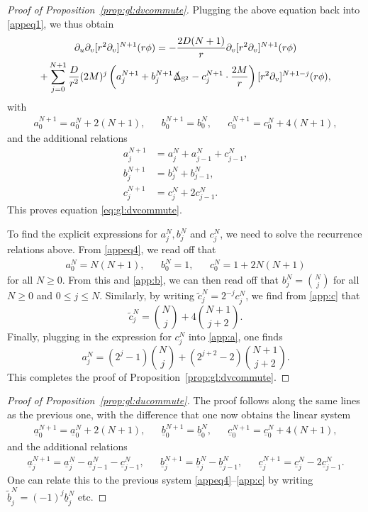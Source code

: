 \documentclass[11pt,english]{article}
\numberwithin{equation}{section}
\theoremstyle{remark}
\theoremstyle{plain}
\theoremstyle{remark}
\newcommand{\pu}{\partial_u}
\newcommand{\pv}{\partial_v}
\renewcommand{\(}{\left(}
\renewcommand{\)}{\right)}
\begin{document}
\begin{proof}[Proof of Proposition~\ref{prop:gl:dvcommute}]
Plugging the above equation back into \eqref{appeq1}, we thus obtain
\begin{multline}
\pu\pv[r^2\pv]^{N+1}(r\phi)=-\frac{2D(N+1)}{r}\pv[r^2\pv]^{N+1}(r\phi)\\+
\sum_{j=0}^{N+1}\frac{D}{r^2}(2M)^j\left(a_j^{N+1}+b_j^{N+1}\slashed{\Delta}_{\mathbb{S}^2}-c_j^{N+1}\cdot\frac{2M}{r}\right)[r^2\pv]^{N+1-j}(r\phi),
\end{multline}
with 
\begin{align}\label{appeq4}
a_0^{N+1}=a_0^N+2(N+1),&&b_0^{N+1}=b_0^N,&&c_0^{N+1}=c_0^N+4(N+1),
\end{align}
and the additional relations
\begin{align}
a_j^{N+1}&=a_j^N+a_{j-1}^N+c_{j-1}^N\label{app:a},\\
b_j^{N+1}&=b_{j}^N+b_{j-1}^N,\label{app:b}\\
c_{j}^{N+1}&=c_j^N+2c_{j-1}^N.\label{app:c}
\end{align}
This proves equation \eqref{eq:gl:dvcommute}. 

To find the explicit expressions for $a_j^N, b_j^N$ and $c_j^N$, we need to solve the recurrence relations above.
From \eqref{appeq4}, we read off that
\begin{align*}
a_0^{N}=N(N+1),&&b_0^N=1, &&c_0^N=1+2N(N+1)
\end{align*}
for all $N\geq 0$.
From this and \eqref{app:b}, we can then read off that $b_j^N=\binom{N}{j}$ for all $N \geq 0$ and $0\leq j\leq N$. Similarly, by writing $\tilde{c}_j^N=2^{-j}c_j^N$, we find from \eqref{app:c} that 
\[\tilde{c}_j^N=\binom{N}{j}+4\binom{N+1}{j+2}.\]
Finally, plugging in the expression for $c_j^N$ into \eqref{app:a}, one finds
\[a_j^N=(2^j-1)\binom{N}{j}+(2^{j+2}-2)\binom{N+1}{j+2}.\]
This completes the proof of Proposition~\ref{prop:gl:dvcommute}.
\end{proof}
\begin{proof}[Proof of Proposition~\ref{prop:gl:ducommute}]
The proof follows along the same lines as the previous one, with the difference that one now obtains the linear system
\begin{align}
\underline{a}_0^{N+1}=\underline a_0^N+2(N+1),&&\underline b_0^{N+1}=\underline b_0^N,&&\underline c_0^{N+1}=\underline c_0^N+4(N+1),
\end{align}
and the additional relations
\begin{align}
\underline a_j^{N+1}=\underline a_j^N-\underline a_{j-1}^N-\underline c_{j-1}^N,&&
\underline b_j^{N+1}=\underline b_{j}^N-\underline b_{j-1}^N,&&
\underline c_{j}^{N+1}=\underline c_j^N-2\underline c_{j-1}^N.
\end{align}
One can relate this to the previous system \eqref{appeq4}--\eqref{app:c} by writing $\underline{ \tilde b}_j^N=(-1)^{j}\underline{b}_j^N$ etc.
\end{proof}
\end{document}
